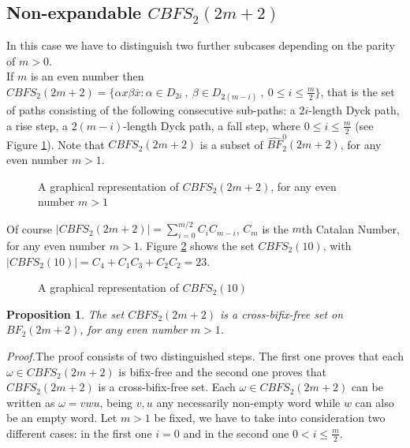 \documentclass[a4paper,11pt]{article}
\newtheorem{proposition}{Proposition}[section]
\begin{document}
\subsection{Non-expandable $CBFS_2(2m+2)$}
In this case we have to distinguish
two further subcases depending on the parity of $m > 0$.\\

If $m$ is an even number then $CBFS_2(2m+2) = \{ \alpha x \beta
\overline{x} : \alpha \in D_{2i} \ , \ \beta \in D_{2(m-i)} \ , \
0 \leq i \leq \frac{m}{2} \}$, that is the set of paths consisting
of the following consecutive sub-paths: a $2i$-length Dyck path, a
rise step, a $2(m-i)$-length Dyck path, a fall step, where $0 \leq
i \leq \frac{m}{2}$ (see Figure \ref{paripari}). Note that
$CBFS_2(2m+2)$ is a subset of $\hat{BF}^0_2(2m+2)$, for any even
number $m>1$.

\begin{figure}[!htb]
\begin{center}
 \caption{\small{A
graphical representation of $CBFS_2(2m+2)$, for any even number
$m>1$} \label{paripari}}\vspace{-15pt}
\end{center}
\end{figure}

Of course $|CBFS_2(2m+2)|=\sum_{i=0}^{m/2}C_iC_{m-i}$, $C_m$ is
the $m$th Catalan Number, for any even number $m>1$. Figure
\ref{exmpari} shows the set $CBFS_2(10)$, with
$|CBFS_2(10)|=C_4+C_1C_3+C_2C_2=23$.

\begin{figure}[!htb]
\begin{center}
 \caption{\small{A
graphical representation of $CBFS_2(10)$}
\label{exmpari}}\vspace{-15pt}
\end{center}
\end{figure}

\begin{proposition}\label{paripariCB}
The set $CBFS_2(2m+2)$ is a cross-bifix-free set on $BF_2(2m+2)$,
for any even number $m > 1$.
\end{proposition}
\emph{Proof.}\quad The proof consists of two distinguished steps.
The first one proves that each $\omega \in CBFS_2(2m+2)$ is
bifix-free and the second one proves that $CBFS_2(2m+2)$ is a
cross-bifix-free set. Each $\omega \in CBFS_2(2m+2)$ can be
written as $\omega=vwu$, being $v,u$ any necessarily non-empty
word while $w$ can also be an empty word. Let $m > 1$ be fixed, we
have to take into consideration two different cases: in the first
one $i=0$ and in the second one $0 < i \leq \frac{m}{2}$.
\end{document}
